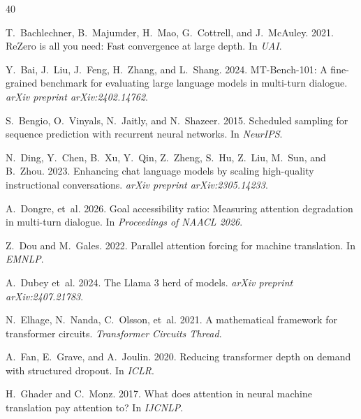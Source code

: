 \documentclass[11pt]{article}
\begin{document}

\begin{thebibliography}{40}

T.~Bachlechner, B.~Majumder, H.~Mao, G.~Cottrell, and J.~McAuley. 2021.
\newblock ReZero is all you need: Fast convergence at large depth.
\newblock In \emph{UAI}.

Y.~Bai, J.~Liu, J.~Feng, H.~Zhang, and L.~Shang. 2024.
\newblock MT-Bench-101: A fine-grained benchmark for evaluating large language models in multi-turn dialogue.
\newblock \emph{arXiv preprint arXiv:2402.14762}.

S.~Bengio, O.~Vinyals, N.~Jaitly, and N.~Shazeer. 2015.
\newblock Scheduled sampling for sequence prediction with recurrent neural networks.
\newblock In \emph{NeurIPS}.

N.~Ding, Y.~Chen, B.~Xu, Y.~Qin, Z.~Zheng, S.~Hu, Z.~Liu, M.~Sun, and B.~Zhou. 2023.
\newblock Enhancing chat language models by scaling high-quality instructional conversations.
\newblock \emph{arXiv preprint arXiv:2305.14233}.

A.~Dongre, et~al. 2026.
\newblock Goal accessibility ratio: Measuring attention degradation in multi-turn dialogue.
\newblock In \emph{Proceedings of NAACL 2026}.

Z.~Dou and M.~Gales. 2022.
\newblock Parallel attention forcing for machine translation.
\newblock In \emph{EMNLP}.

A.~Dubey et~al. 2024.
\newblock The Llama 3 herd of models.
\newblock \emph{arXiv preprint arXiv:2407.21783}.

N.~Elhage, N.~Nanda, C.~Olsson, et~al. 2021.
\newblock A mathematical framework for transformer circuits.
\newblock \emph{Transformer Circuits Thread}.

A.~Fan, E.~Grave, and A.~Joulin. 2020.
\newblock Reducing transformer depth on demand with structured dropout.
\newblock In \emph{ICLR}.

H.~Ghader and C.~Monz. 2017.
\newblock What does attention in neural machine translation pay attention to?
\newblock In \emph{IJCNLP}.


\end{thebibliography}
\end{document}
